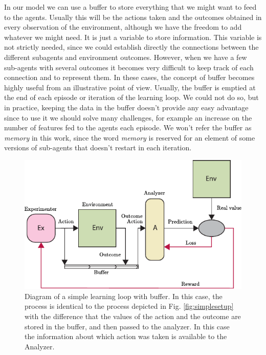 \documentclass[11pt,a4paper,twoside]{report}
\newcommand{\+}{\textnormal{+} }
\theoremstyle{definition}
\numberwithin{equation}{chapter}
\begin{document}
In our model we can use a buffer to store everything that we might want to feed
to the agents. Usually this will be the actions taken and the outcomes obtained
in every observation of the environment, although we have the freedom to add
whatever we might need. It is just a variable to store information. This
variable is not strictly needed, since we could establish directly the
connections between the different subagents and environment outcomes. However,
when we have a few sub-agents with several outcomes it becomes very difficult to
keep track of each connection and to represent them. In these cases, the concept
of buffer becomes highly useful from an illustrative point of view. Usually, the
buffer is emptied at the end of each episode or iteration of the learning loop.
We could not do so, but in practice, keeping the data in the buffer doesn't
provide any easy advantage since to use it we should solve many challenges, for
example an increase on the number of features fed to the agents each episode.
We won't refer the buffer as \textit{memory} in this work, since the word
\textit{memory} is reserved for an element of some versions of sub-agents that
doesn't restart in each iteration. 


\begin{figure}
  \centering
  \includegraphics{figures/SimpleSetUp(Buffer).pdf}
  \caption{Diagram of a simple learning loop with buffer. In this case, the
  process is identical to the process depicted in Fig. \ref{fig:simplesetup}
  with the difference that the values of the action and the outcome are stored
  in the buffer, and then passed to the analyzer. In this case the information
  about which action was taken is available to the Analyzer.} 
  \label{fig:simplesetupbuffer}
\end{figure}
\end{document}
